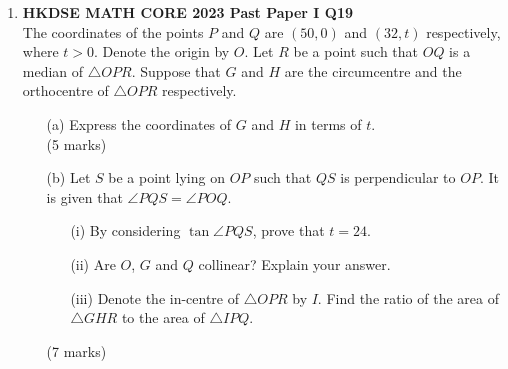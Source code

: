 \documentclass[12pt]{article}
\begin{document}
\begin{enumerate}
	\item \textbf{HKDSE MATH CORE 2023 Past Paper I Q19}\\
	The coordinates of the points $P$ and $Q$ are $(50 , 0)$ and $(32 , t)$ respectively, where $t > 0$. Denote the origin by $O$. Let $R$ be a point such that $OQ$ is a median of $\triangle OPR$. Suppose that $G$ and $H$ are the circumcentre and the orthocentre of $\triangle OPR$ respectively.
	\begin{enumerate}
		\item[(a)] Express the coordinates of $G$ and $H$ in terms of $t$. \\(5 marks)
		\item[(b)] Let $S$ be a point lying on $OP$ such that $QS$ is perpendicular to $OP$. It is given that $\angle PQS = \angle POQ$.
		\begin{enumerate}
			\item[(i)] By considering $\tan{\angle PQS}$, prove that $t = 24$.
			\item[(ii)] Are $O$, $G$ and $Q$ collinear? Explain your answer.
			\item[(iii)] Denote the in-centre of $\triangle OPR$ by $I$. Find the ratio of the area of $\triangle GHR$ to the area of $\triangle IPQ$.
		\end{enumerate}
		(7 marks)
	\end{enumerate}


\end{enumerate}
\end{document}
